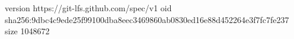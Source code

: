 version https://git-lfs.github.com/spec/v1
oid sha256:9dbc4c9ede25f99100dba8eec3469860ab0830ed16e88d452264e3f7fc7fe237
size 1048672
